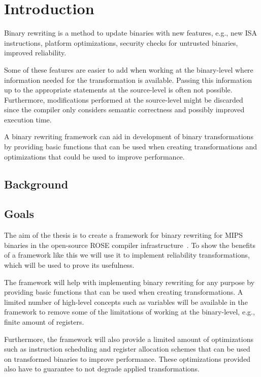 \chapter{Introduction}
Binary rewriting is a method to update binaries with new
features, e.g., new ISA instructions, platform optimizations,
security checks for untrusted binaries, improved reliability.
%

Some of these features are easier to add when working at the binary-level
where information needed for the transformation is available.
Passing this information up to the appropriate statements at the
source-level is often not possible.
%
Furthermore, modifications performed at the source-level might be discarded
since the compiler only considers semantic correctness and
possibly improved execution time.
%

A binary rewriting framework can aid in development of binary
transformations by providing basic functions that can be
used when creating transformations and optimizations that could
be used to improve performance.
%

\section{Background}


\section{Goals}
The aim of the thesis is to create a framework for binary rewriting for MIPS
binaries in the open-source ROSE compiler infrastructure~\cite{rose}.
To show the benefits of a framework like this we will use it to implement
reliability transformations, which will be used to prove its usefulness.
%

The framework will help with implementing binary rewriting for
any purpose by providing basic functions that can be used when creating
transformations. A limited number of high-level concepts such as variables
will be available in the framework to remove some of the limitations of working
at the binary-level, e.g., finite amount of registers.
%

Furthermore, the framework will also provide a limited amount of optimizations
such as instruction scheduling and register allocation schemes that can
be used on transformed binaries to improve performance. These optimizations
provided also have to guarantee to not degrade applied transformations.


